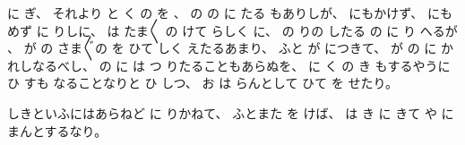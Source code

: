 に
ぎ、
%
それより
と
く
の
を
、
%
の
の
に
たる
もありしが、
%
にもかけず、
%
にも
めず
に
りしに、
%
は
たま〳〵
の
けて
らしく
に、
%
の
りの
したる
の
に
り
へるが
、
%
が
の
さま〴〵の
を
ひて
しく
えたるあまり、
%
ふと
が
につきて、
%
が
の
に
かれしなるべし、
%
の
に
は
つ
りたることもあらぬを、
%
に
く
の
き
もするやうに
ひ
すも
なることなりと
ひ
しつ、
%
お
は
らんとして
ひて
を
せたり。

%
しきといふにはあらねど
に
りかねて、
%
ふとまた
を
けば、
%
は
き
に
きて
や
に
まんとするなり。

